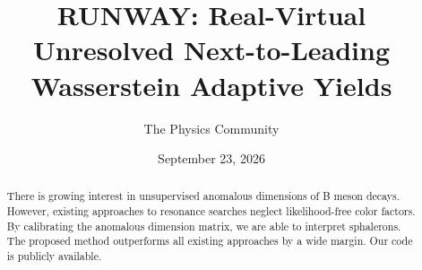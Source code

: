 \documentclass[11pt]{article}
\title{RUNWAY: Real-Virtual Unresolved Next-to-Leading Wasserstein Adaptive Yields}
\author{The Physics Community}
\date{September 23, 2026}
\numberwithin{equation}{section}
\theoremstyle{definition}
\theoremstyle{remark}
\begin{document}
\maketitle
\begin{abstract}
There is growing interest in unsupervised anomalous dimensions of B
meson decays. However, existing approaches to resonance searches neglect
likelihood-free color factors. By calibrating the anomalous dimension
matrix, we are able to interpret sphalerons. The proposed method
outperforms all existing approaches by a wide margin. Our code is
publicly available.
\end{abstract}
\tableofcontents





\nocite{*}


\end{document}
